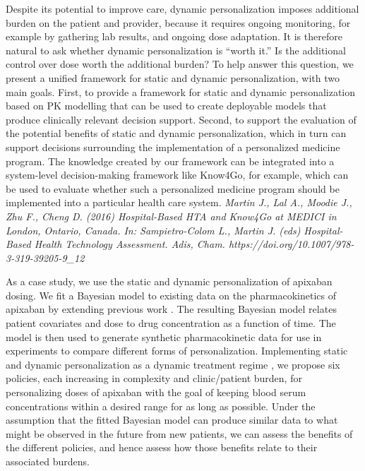 Despite its potential to improve care, dynamic personalization imposes additional burden on the patient and provider, because it requires ongoing monitoring, for example by gathering lab results, and ongoing dose adaptation. It is therefore natural to ask whether dynamic personalization is ``worth it.'' Is the additional control over dose worth the additional burden? To help answer this question, we present a unified framework for static and dynamic personalization, with two main goals.  First, to provide a framework for static and dynamic personalization based on PK modelling that can be used to create deployable models that produce clinically relevant decision support. Second, to support the evaluation of the potential benefits of static and dynamic personalization, which in turn can support decisions surrounding the implementation of a personalized medicine program. The knowledge created by our framework can be integrated into a system-level decision-making framework like Know4Go, for example, which can be used to evaluate whether such a personalized medicine program should be implemented into a particular health care system. \textit{Martin J., Lal A., Moodie J., Zhu F., Cheng D. (2016) Hospital-Based HTA and Know4Go at MEDICI in London, Ontario, Canada. In: Sampietro-Colom L., Martin J. (eds) Hospital-Based Health Technology Assessment. Adis, Cham. https://doi.org/10.1007/978-3-319-39205-9\_12}

As a case study, we use the static and dynamic personalization of apixaban dosing. We fit a Bayesian model to existing data on the pharmacokinetics of apixaban by extending previous work \cite{pananosPrevious}.  The resulting Bayesian model relates patient covariates and dose to drug concentration as a function of time. The model is then used to generate synthetic pharmacokinetic data for use in experiments to compare different forms of personalization. Implementing static and dynamic personalization as a dynamic treatment regime \citep{chakraborty2013statistical}, we propose six policies, each increasing in complexity and clinic/patient burden, for personalizing doses of apixaban with the goal of keeping blood serum concentrations within a desired range for as long as possible. Under the assumption that the fitted Bayesian model can produce similar data to what might be observed in the future from new patients, we can assess the benefits of the different policies, and hence assess how those benefits relate to their associated burdens.

